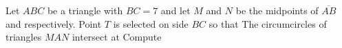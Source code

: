 Let $ABC$ be a triangle with   $BC = 7$ and let $M$ and $N$ be the midpoints of $\overline{AB}$ and  respectively. Point $T$ is selected on side $BC$ so that  The circumcircles of triangles  $MAN$ intersect at  Compute 